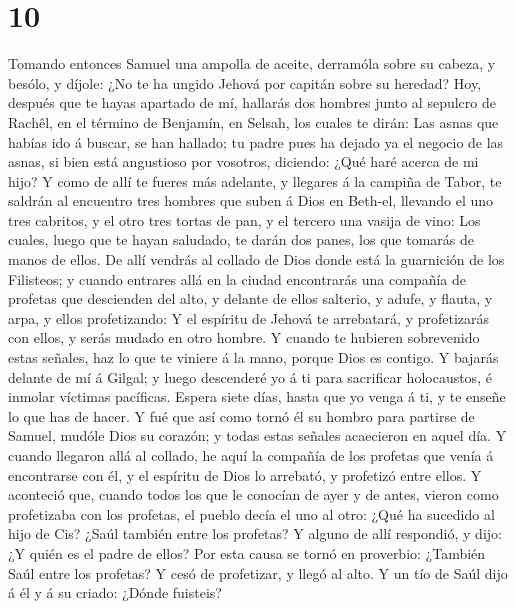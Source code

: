 \hypertarget{section-9}{%
\section{10}\label{section-9}}

 Tomando entonces Samuel una ampolla de aceite, derramóla
sobre su cabeza, y besólo, y díjole: ¿No te ha ungido Jehová por capitán
sobre su heredad?  Hoy, después que te hayas apartado de mí,
hallarás dos hombres junto al sepulcro de Rachêl, en el término de
Benjamín, en Selsah, los cuales te dirán: Las asnas que habías ido á
buscar, se han hallado; tu padre pues ha dejado ya el negocio de las
asnas, si bien está angustioso por vosotros, diciendo: ¿Qué haré acerca
de mi hijo?  Y como de allí te fueres más adelante, y
llegares á la campiña de Tabor, te saldrán al encuentro tres hombres que
suben á Dios en Beth-el, llevando el uno tres cabritos, y el otro tres
tortas de pan, y el tercero una vasija de vino:  Los cuales,
luego que te hayan saludado, te darán dos panes, los que tomarás de
manos de ellos.  De allí vendrás al collado de Dios donde
está la guarnición de los Filisteos; y cuando entrares allá en la ciudad
encontrarás una compañía de profetas que descienden del alto, y delante
de ellos salterio, y adufe, y flauta, y arpa, y ellos profetizando:
 Y el espíritu de Jehová te arrebatará, y profetizarás con
ellos, y serás mudado en otro hombre.  Y cuando te hubieren
sobrevenido estas señales, haz lo que te viniere á la mano, porque Dios
es contigo.  Y bajarás delante de mí á Gilgal; y luego
descenderé yo á ti para sacrificar holocaustos, é inmolar víctimas
pacíficas. Espera siete días, hasta que yo venga á ti, y te enseñe lo
que has de hacer.  Y fué que así como tornó él su hombro
para partirse de Samuel, mudóle Dios su corazón; y todas estas señales
acaecieron en aquel día.  Y cuando llegaron allá al
collado, he aquí la compañía de los profetas que venía á encontrarse con
él, y el espíritu de Dios lo arrebató, y profetizó entre ellos.
 Y aconteció que, cuando todos los que le conocían de ayer
y de antes, vieron como profetizaba con los profetas, el pueblo decía el
uno al otro: ¿Qué ha sucedido al hijo de Cis? ¿Saúl también entre los
profetas?  Y alguno de allí respondió, y dijo: ¿Y quién es
el padre de ellos? Por esta causa se tornó en proverbio: ¿También Saúl
entre los profetas?  Y cesó de profetizar, y llegó al alto.
 Y un tío de Saúl dijo á él y á su criado: ¿Dónde fuisteis?
